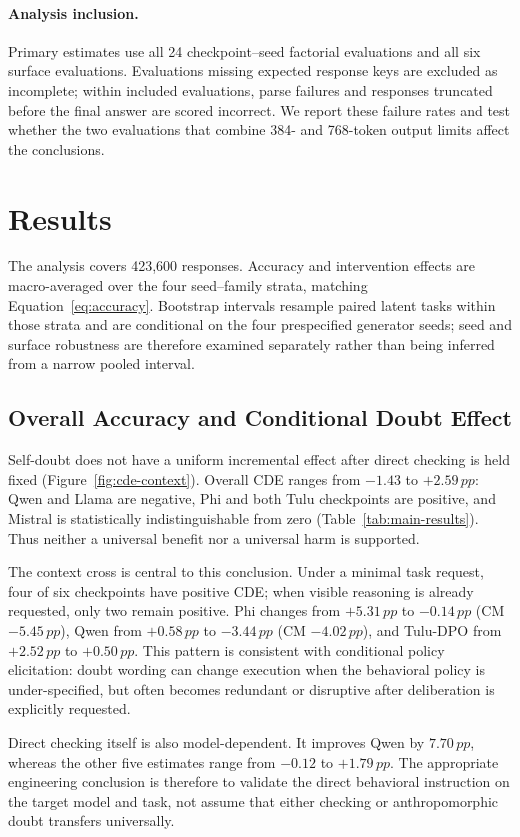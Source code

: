 \documentclass[sigconf]{acmart}
\newcommand{\pp}{\,pp}
\newcommand{\revision}[1]{\textcolor{revisionred}{#1}}
\newenvironment{revisionblock}{\color{revisionred}}{}
\begin{document}
\paragraph{Analysis inclusion.}
\revision{Primary estimates use all 24 checkpoint--seed factorial evaluations
and all six surface evaluations. Evaluations missing expected response keys
are excluded as incomplete; within included evaluations, parse failures and
responses truncated before the final answer are scored incorrect. We report
these failure rates and test whether the two evaluations that combine 384- and
768-token output limits affect the conclusions.}

\section{Results}
\label{sec:results}

\begin{revisionblock}
The analysis covers 423,600 responses. Accuracy and intervention
effects are macro-averaged over the four seed--family strata, matching
Equation~\ref{eq:accuracy}. Bootstrap intervals resample paired latent tasks
within those strata and are conditional on the four prespecified generator seeds;
seed and surface robustness are therefore examined separately rather than
being inferred from a narrow pooled interval.
\end{revisionblock}

\subsection{Overall Accuracy and Conditional Doubt Effect}

\begin{revisionblock}
Self-doubt does not have a uniform incremental effect after direct checking is
held fixed (Figure~\ref{fig:cde-context}). Overall CDE ranges from $-1.43$ to
$+2.59\pp$: Qwen and Llama are negative, Phi and both Tulu checkpoints are
positive, and Mistral is statistically indistinguishable from zero
(Table~\ref{tab:main-results}). Thus neither a universal benefit nor a
universal harm is supported.

The context cross is central to this conclusion. Under a minimal task request,
four of six checkpoints have positive CDE; when visible reasoning is already
requested, only two remain positive. Phi changes from $+5.31\pp$ to
$-0.14\pp$ (CM $-5.45\pp$), Qwen from $+0.58\pp$ to $-3.44\pp$ (CM
$-4.02\pp$), and Tulu-DPO from $+2.52\pp$ to $+0.50\pp$. This pattern is
consistent with conditional policy elicitation: doubt wording can change
execution when the behavioral policy is under-specified, but often becomes
redundant or disruptive after deliberation is explicitly requested.

Direct checking itself is also model-dependent. It improves Qwen by
$7.70\pp$, whereas the other five estimates range from $-0.12$ to
$+1.79\pp$. The appropriate engineering conclusion is therefore to validate
the direct behavioral instruction on the target model and task, not assume
that either checking or anthropomorphic doubt transfers universally.
\end{revisionblock}
\end{document}
